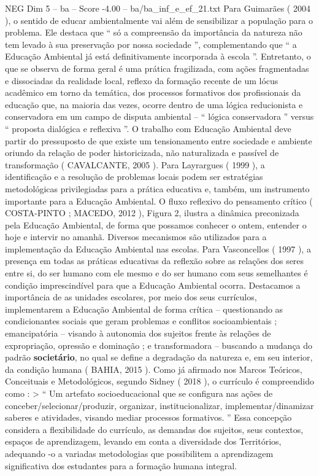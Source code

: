 \begin{textsample}{NEG Dim 5 – ba – Score -4.00 – ba/ba\_inf\_e\_ef\_21.txt}
Para Guimarães ( 2004 ), o sentido de educar ambientalmente vai além de sensibilizar a população para o problema.
Ele destaca que “ só a compreensão da importância da natureza não tem levado à sua preservação por nossa sociedade ”, complementando que “ a Educação Ambiental já está definitivamente incorporada à escola ”.
Entretanto, o que se observa de forma geral é uma prática fragilizada, com ações fragmentadas e dissociadas da realidade local, reflexo da formação recente de um lócus acadêmico em torno da temática, dos processos formativos dos profissionais da educação que, na maioria das vezes, ocorre dentro de uma lógica reducionista e conservadora em um campo de disputa ambiental – “ lógica conservadora ” versus “ proposta dialógica e reflexiva ”.
O trabalho com Educação Ambiental deve partir do pressuposto de que existe um tensionamento entre sociedade e ambiente oriundo da relação de poder historicizada, não naturalizada e passível de transformação ( CAVALCANTE, 2005 ).
Para Layrargues ( 1999 ), a identificação e a resolução de problemas locais podem ser estratégias metodológicas privilegiadas para a prática educativa e, também, um instrumento importante para a Educação Ambiental.
O fluxo reflexivo do pensamento crítico ( COSTA-PINTO ; MACEDO, 2012 ), Figura 2, ilustra a dinâmica preconizada pela Educação Ambiental, de forma que possamos conhecer o ontem, entender o hoje e intervir no amanhã.
Diversos mecanismos são utilizados para a implementação da Educação Ambiental nas escolas.
Para Vasconcellos ( 1997 ), a presença em todas as práticas educativas da reflexão sobre as relações dos seres entre si, do ser humano com ele mesmo e do ser humano com seus semelhantes é condição imprescindível para que a Educação Ambiental ocorra.
Destacamos a importância de as unidades escolares, por meio dos seus currículos, implementarem a Educação Ambiental de forma crítica – questionando as condicionantes sociais que geram problemas e conflitos socioambientais ; emancipatória – visando à autonomia dos sujeitos frente às relações de expropriação, opressão e dominação ; e transformadora – buscando a mudança do padrão \textbf{societário}, no qual se define a degradação da natureza e, em seu interior, da condição humana ( BAHIA, 2015 ).
Como já afirmado nos Marcos Teóricos, Conceituais e Metodológicos, segundo Sidney ( 2018 ), o currículo é compreendido como : > “ Um artefato socioeducacional que se configura nas ações de conceber/selecionar/produzir, organizar, institucionalizar, implementar/dinamizar saberes e atividades, visando mediar processos formativos. ” Essa concepção considera a flexibilidade do currículo, as demandas dos sujeitos, seus contextos, espaços de aprendizagem, levando em conta a diversidade dos Territórios, adequando -o a variadas metodologias que possibilitem a aprendizagem significativa dos estudantes para a formação humana integral.

\end{textsample}
